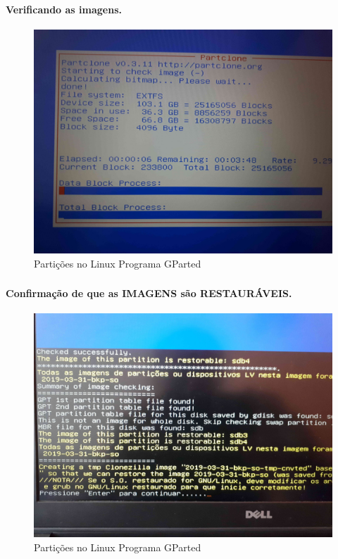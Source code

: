 \documentclass{beamer}
\begin{document}
	
\begin{frame}[plain,c]
   \frametitle{\insertsection}
    \framesubtitle{Verificando as imagens.}
    \begin{figure}[!h]
        \includegraphics[width=1\linewidth]{images/rest/res17.jpg}
        \caption{Partições no Linux Programa GParted}
    \end{figure}
\end{frame}		

\begin{frame}[plain,c]
   \frametitle{\insertsection}
    \framesubtitle{Confirmação de que as IMAGENS são RESTAURÁVEIS.}
    \begin{figure}[!h]
        \includegraphics[width=1\linewidth]{images/rest/res18.jpg}
        \caption{Partições no Linux Programa GParted}
    \end{figure}
\end{frame}
\end{document}
